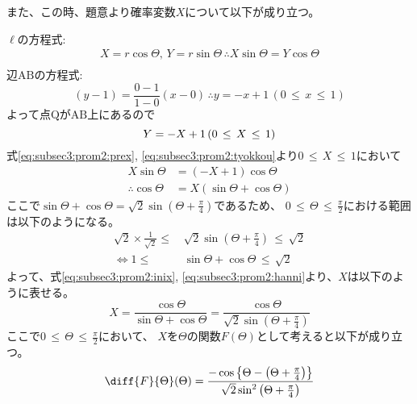 \begin{enumerate}[(1)]
    また、この時、題意より確率変数$X$について以下が成り立つ。
    
    $\ell$の方程式: 
    \begin{align}
        X = r\cos\Theta, \, Y = r\sin\Theta\, 
        \therefore X\sin\Theta = Y\cos\Theta\label{eq:subsec3:prom2:prex}\\
    \end{align}
    辺$\mathrm{AB}$の方程式:
    \begin{equation*}
        (y - 1) = \frac{0 - 1}{1 - 0}(x - 0)\, \therefore y = -x + 1\, (0\, \leq \, x \, \leq \, 1)
    \end{equation*}
    よって点$\mathrm{Q}$が$\mathrm{AB}$上にあるので
    \begin{equation}
        Y = -X + 1\, (0\, \leq\,  X\, \leq \, 1)\label{eq:subsec3:prom2:tyokkou}\\
    \end{equation}
    式\eqref{eq:subsec3:prom2:prex}, \eqref{eq:subsec3:prom2:tyokkou}より$0\, \leq\, X\, \leq\, 1$において
    \begin{align}
        X\sin\Theta &= (-X + 1)\cos\Theta\nonumber\\
        \therefore \cos\Theta &= X(\sin\Theta + \cos\Theta)\label{eq:subsec3:prom2:inix}
    \end{align}
    ここで$\sin\Theta + \cos\Theta = \sqrt{2}\sin\left(\Theta + \frac{\pi}{4}\right)$であるため、
    $0\, \leq\, \Theta\, \leq \, \frac{\pi}{2}$における範囲は以下のようになる。
    \begin{align}
        \sqrt{2}\times\frac{1}{\sqrt{2}} \leq\, &\sqrt{2}\sin\left(\Theta + \frac{\pi}{4}\right) \, \leq\, \sqrt{2}\nonumber\\
        \Longleftrightarrow 
        1 \leq\, &\sin\Theta + \cos\Theta \, \leq\, \sqrt{2}\label{eq:subsec3:prom2:hanni}
    \end{align}
    よって、式\eqref{eq:subsec3:prom2:inix}, \eqref{eq:subsec3:prom2:hanni}より、$X$は以下のように表せる。
    \begin{equation}
        X = \frac{\cos\Theta}{\sin\Theta + \cos\Theta} = \frac{\cos\Theta}{\sqrt{2}\sin\left(\Theta + \frac{\pi}{4}\right)}\label{eq:subsec3:prom2:x}
    \end{equation}
    ここで$0\, \leq\, \Theta\, \leq\, \frac{\pi}{2}$において、
    $X$を$\Theta$の関数$F(\Theta)$として考えると以下が成り立つ。
    \begin{align*}
        \diff{F}{\Theta}(\Theta) 
        &= \frac{-\cos\left\{\Theta - \left(\Theta + \frac{\pi}{4}\right)\right\}}{\sqrt{2}\sin^{2}\left(\Theta + \frac{\pi}{4}\right)}\\

\end{align*}
\end{enumerate}
